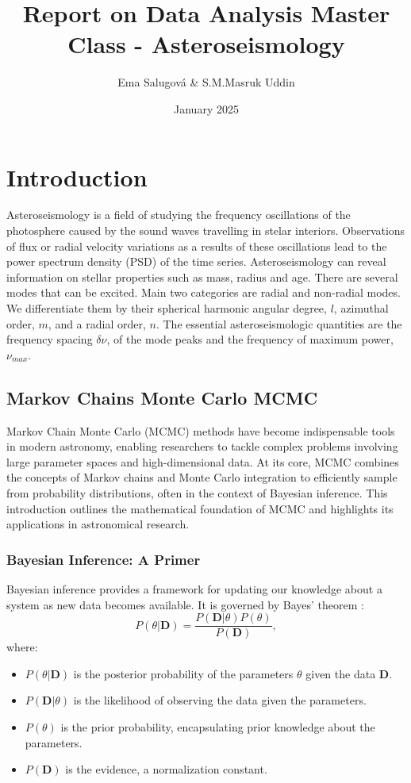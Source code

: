 \documentclass[12pt]{article}
\title{Report on Data  Analysis Master Class  - Asteroseismology}
\author{Ema Salugová \& S.M.Masruk Uddin}
\date{January 2025}
\date{}
\begin{document}
\maketitle
\tableofcontents
\section{Introduction}
Asteroseismology is a field of studying the frequency oscillations of the photosphere caused by the sound waves travelling in stelar interiors. Observations of flux or radial velocity variations as a results of these oscillations lead to the power spectrum density (PSD) of the time series. Asteroseismology can reveal information on stellar properties such as mass, radius and age. There are several modes that can be excited. Main two categories are radial and non-radial modes. We differentiate them by their spherical harmonic angular degree, $l$, azimuthal order, $m$, and a radial order, $n$. The essential asteroseismologic quantities are the frequency spacing $\delta \nu$, of the mode peaks and the frequency of maximum power, $\nu_{max}$.

\subsection*{Markov Chains Monte Carlo MCMC}
Markov Chain Monte Carlo (MCMC) methods have become indispensable tools in modern astronomy, enabling researchers to tackle complex problems involving large parameter spaces and high-dimensional data. At its core, MCMC combines the concepts of Markov chains and Monte Carlo integration to efficiently sample from probability distributions, often in the context of Bayesian inference. This introduction outlines the mathematical foundation of MCMC and highlights its applications in astronomical research.

\subsubsection*{Bayesian Inference: A Primer}
Bayesian inference provides a framework for updating our knowledge about a system as new data becomes available. It is governed by Bayes' theorem \cite{Rees}:
\begin{equation}
    P(\theta | \mathbf{D}) = \frac{P(\mathbf{D} | \theta) P(\theta)}{P(\mathbf{D})},
\end{equation}
where:
\begin{itemize}
    \item $P(\theta | \mathbf{D})$ is the posterior probability of the parameters $\theta$ given the data $\mathbf{D}$.
    \item $P(\mathbf{D} | \theta)$ is the likelihood of observing the data given the parameters.
    \item $P(\theta)$ is the prior probability, encapsulating prior knowledge about the parameters.
    \item $P(\mathbf{D})$ is the evidence, a normalization constant.
\end{itemize}
\end{document}
